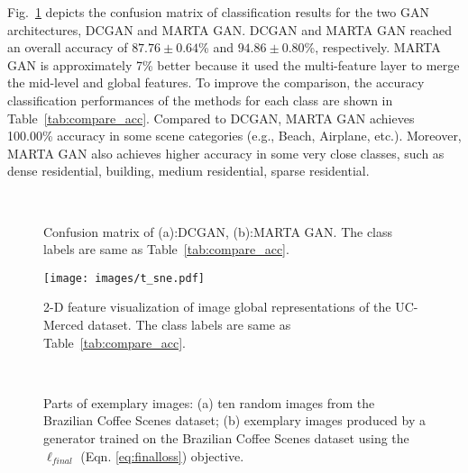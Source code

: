 \documentclass[journal]{IEEEtran}
\begin{document}
Fig.~\ref{fig:conf_matix} depicts the confusion matrix of classification results for the two GAN architectures, DCGAN and MARTA GAN. DCGAN and MARTA GAN reached an overall accuracy of $87.76\pm0.64$\% and $94.86\pm0.80$\%, respectively. MARTA GAN is approximately 7\% better because it used the multi-feature layer to merge the mid-level and global features. To improve the comparison, the accuracy classification performances of the methods for each class are shown in Table~\ref{tab:compare_acc}. Compared to DCGAN, MARTA GAN achieves 100.00\% accuracy in some scene categories (e.g., Beach, Airplane, etc.). Moreover, MARTA GAN also achieves higher accuracy in some very close classes, such as dense residential, building, medium residential, sparse residential.


















\begin{figure}[t]
	\centering
	\hfill
	\\
	\caption{Confusion matrix of (a):DCGAN, (b):MARTA GAN. The class labels are same as Table~\ref{tab:compare_acc}.}
	\label{fig:conf_matix} 
		\vspace{-5mm}
\end{figure}

\begin{figure}[t]
	\centering
	\texttt{[image: images/t\_sne.pdf]}
	\vspace{-1.5em}
	\caption{2-D feature visualization of image global representations of the UC-Merced dataset.  The class labels are same as Table~\ref{tab:compare_acc}.}
	\vspace{-4mm}
	\label{fig:t_sne}
\end{figure}


\begin{figure*} 
	\centering
	\hfill
	\\
	\caption{Parts of exemplary images: (a) ten random images from the Brazilian Coffee Scenes dataset; (b) exemplary images produced by a generator trained on the Brazilian Coffee Scenes dataset using the $\ell _{final}$ (Eqn. \ref{eq:finalloss}) objective.}
	\label{coffee}
		\vspace{-2mm} 
\end{figure*}
\end{document}
